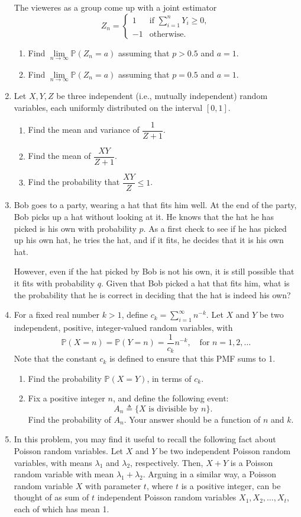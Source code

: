 \documentclass[a4paper,9pt,landscape]{extarticle}
\begin{document}
\begin{multicols*}{3}
\begin{enumerate}
	The vieweres as a group come up with a joint estimator $$Z_n=\begin{cases}
		1&\text{if }\sum_{i=1}^{n}Y_i\geq0,\\
		-1&\text{otherwise.}
	\end{cases}$$
	\begin{enumerate}
		\item Find $\lim\limits_{n\rightarrow\infty}\mathds{P}(Z_n=a)$ assuming that $p>0.5$ and $a=1$.
		\item Find $\lim\limits_{n\rightarrow\infty}\mathds{P}(Z_n=a)$ assuming that $p=0.5$ and $a=1$.
	\end{enumerate}
	\item Let $X,Y,Z$ be three independent (i.e., mutually independent) random variables, each uniformly distributed on the interval $[0,1]$.
	\begin{enumerate}
		\item Find the mean and variance of $\dfrac{1}{Z+1}$.
		\item Find the mean of $\dfrac{XY}{Z+1}$.
		\item Find the probability that $\dfrac{XY}{Z}\leq1$.
	\end{enumerate}
	\item Bob goes to a party, wearing a hat that fits him well. At the end of the party, Bob picks up a hat without looking at it. He knows that the hat he has picked is his own with probability $p$. As a first check to see if he has picked up his own hat, he tries the hat, and if it fits, he decides that it is his own hat.
	
	However, even if the hat picked by Bob is not his own, it is still possible that it fits with probability $q$. Given that Bob picked a hat that fits him, what is the probability that he is correct in deciding that the hat is indeed his own?
	\item For a fixed real number $k>1$, define $c_k=\sum\limits_{i=1}^{\infty}n^{-k}$. Let $X$ and $Y$ be two independent, positive, integer-valued random variables, with $$\mathds{P}(X=n)=\mathds{P}(Y=n)=\dfrac{1}{c_k}n^{-k},\quad\text{for }n=1,2,\dots$$
	Note that the constant $c_k$ is defined to ensure that this PMF sums to 1.
	\begin{enumerate}
		\item Find the probability $\mathds{P}(X=Y)$, in terms of $c_k$.
		\item Fix a positive integer $n$, and define the following event:
		$$A_n\triangleq\{X\text{ is divisible by }n\}.$$
		Find the probability of $A_n$. Your answer should be a function of $n$ and $k$.
	\end{enumerate}
	\item In this problem, you may find it useful to recall the following fact about Poisson random variables. Let $X$ and $Y$ be two independent Poisson random variables, with means $\lambda_1$ and $\lambda_2$, respectively. Then, $X+Y$ is a Poisson random variable with mean $\lambda_1+\lambda_2$. Arguing in a similar way, a Poisson random variable $X$ with parameter $t$, where $t$ is a positive integer, can be thought of as sum of $t$ independent Poisson random variables $X_1,X_2,\dots,X_t$, each of which has mean 1.
	

\end{enumerate}
\end{multicols*}
\end{document}
